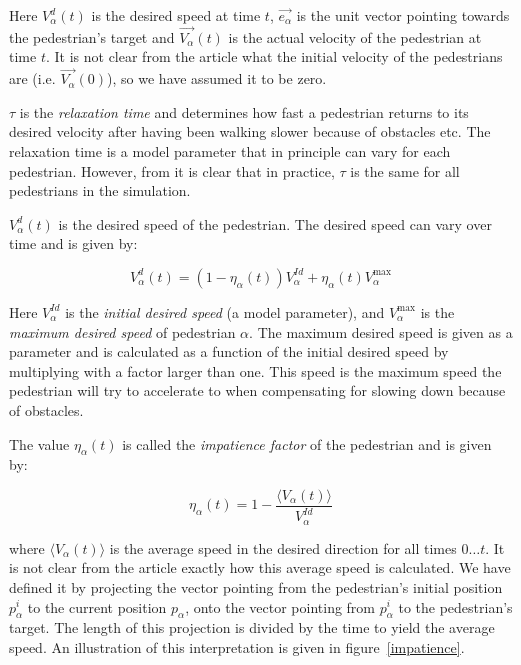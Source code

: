 Here $V_{\alpha}^{d}(t)$ is the desired speed at time $t$,
$\overrightarrow{e_{\alpha}}$ is the unit vector pointing towards the
pedestrian's target and  $\overrightarrow{V_{\alpha}}(t)$ is the actual
velocity of the pedestrian at time $t$. It is not clear from the article what
the initial velocity of the pedestrians are (i.e.
$\overrightarrow{V_\alpha}(0)$), so we have assumed it to be zero.


$\tau$ is the \emph{relaxation time} and determines how fast a pedestrian
returns to its desired velocity after having been walking slower because of
obstacles etc. The relaxation time is a model parameter that in principle can vary
for each pedestrian. However, from \cite{self-org} it is clear that in
practice, $\tau$ is the same for all pedestrians in the simulation.

$V_{\alpha}^{d}(t)$ is the desired speed of the pedestrian. The desired speed
can vary over time and is given by:

\begin{equation}\label{eqn:desired-speed}
    V_{\alpha}^{d}(t) = \left( 1 - \eta_{\alpha}(t) \right)
    V_{\alpha}^{Id} +
    \eta_{\alpha}(t) V_{\alpha}^{\text{max}}
\end{equation}

Here $V_{\alpha}^{Id}$ is the \emph{initial desired speed} (a model
parameter), and $V_{\alpha}^{\text{max}}$ is the \emph{maximum desired speed}
of pedestrian $\alpha$. The maximum desired speed is given as a parameter and
is calculated as a function of the initial desired speed by multiplying with a
factor larger than one. This speed is the maximum speed the pedestrian will
try to accelerate to when compensating for slowing down because of obstacles.

The value $\eta_{\alpha}(t)$ is called the \emph{impatience factor} of the
pedestrian and is given by:

\begin{equation}\label{eqn:impatience}
	\eta_{\alpha}(t) =
    1 - \frac{\langle V_{\alpha}(t)\rangle}{V^{Id}_{\alpha}}
\end{equation}

where $\langle V_{\alpha}(t) \rangle$ is the average speed in the desired
direction for all times $0\dots t$. It is not clear from the article exactly
how this average speed is calculated. We have defined it by projecting the
vector pointing from the pedestrian's initial position $p^i_\alpha$ to the 
current   position $p_\alpha$,  onto the vector pointing from $p^i_\alpha$ to 
the pedestrian's target. The length of this projection is divided by the time 
to yield the average speed. An illustration of this interpretation is given in 
figure~\ref{impatience}.


